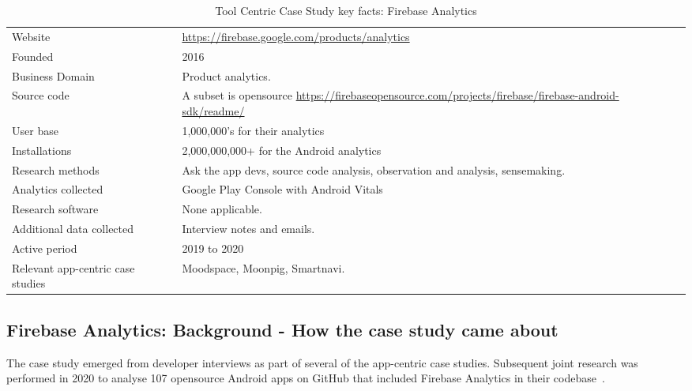 {\renewcommand{\arraystretch}{0.8}%
\begin{table*}
    \centering
    \small
    \setlength{\tabcolsep}{6pt}
    \begin{tabular}{lp{9cm}}
       \toprule
       Website &\url{https://firebase.google.com/products/analytics} \\
       Founded & 2016\footnotemark \\
       Business Domain & Product analytics. \\
       Source code  & A subset is opensource \url{https://firebaseopensource.com/projects/firebase/firebase-android-sdk/readme/} \\
       \midrule
       User base & 1,000,000's for their analytics \\
       Installations & 2,000,000,000+ for the Android analytics\footnotemark \\
       \midrule
       Research methods &Ask the app devs, source code analysis, observation and analysis, sensemaking. \\
       Analytics collected &Google Play Console with Android Vitals \\
       Research software & None applicable. \\
       Additional data collected &Interview notes and emails. \\
       Active period & 2019 to 2020 \\
       Relevant app-centric case studies & Moodspace, Moonpig, Smartnavi.\\
       \bottomrule
    \end{tabular}
    \caption{Tool Centric Case Study key facts: Firebase Analytics}
    \label{tab:firebase_anaytics_overview}
\end{table*}
}


\subsection{Firebase Analytics: Background - How the case study came about}
The case study emerged from developer interviews as part of several of the app-centric case studies. Subsequent joint research was performed in 2020 to analyse 107 opensource Android apps on GitHub that included Firebase Analytics in their codebase~.

